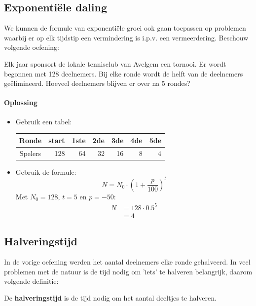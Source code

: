 \documentclass[12pt,twoside,a4paper]{article}
\begin{document}
\pagebreak
\subsection{Exponentiële daling}

We kunnen de formule van exponentiële groei ook gaan toepassen op problemen waarbij er op elk tijdstip een vermindering is i.p.v. een vermeerdering. Beschouw volgende oefening:

Elk jaar sponsort de lokale tennisclub van Avelgem een tornooi. Er wordt begonnen met 128 deelnemers. Bij elke ronde wordt de helft van de deelnemers geëlimineerd. Hoeveel deelnemers blijven er over na 5 rondes?

\paragraph*{Oplossing}
\begin{itemize}
  \itemsep1em
  \item Gebruik een tabel:
  \begin{center}
    \begin{tabular}{c|r|r|r|r|r|r}
      Ronde   & start & 1ste & 2de & 3de & 4de & 5de \\
      \hline
      Spelers & 128   & 64   & 32  & 16  & 8   & 4 
    \end{tabular}
  \end{center}
  \item Gebruik de formule:
  $$N=N_0\cdot\left(1+\dfrac{p}{100}\right)^t$$
  Met $N_0 = 128$, $t=5$ en $p=-50$:
  \begin{align*}
    N &= 128\cdot0.5^5\\
      &= 4
  \end{align*}
\end{itemize}

\subsection{Halveringstijd}

In de vorige oefening werden het aantal deelnemers elke ronde gehalveerd. In veel problemen met de natuur is de tijd nodig om 'iets' te halveren belangrijk, daarom volgende definitie:\\

\begin{mdframed}
De {\bf halveringstijd} is de tijd nodig om het aantal deeltjes te halveren.
\end{mdframed}
\end{document}
